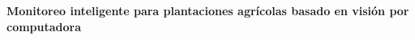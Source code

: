 \begin{titlepage}

    \begin{flushright}
        \setlength{\rightskip}{-2cm} %
        \vspace*{7.5cm} %

        {\bfseries\fontsize{33pt}{40pt}\selectfont
        Monitoreo inteligente para plantaciones agrícolas basado en visión por computadora} \\[1.5cm]


\end{flushright}
\end{titlepage}
